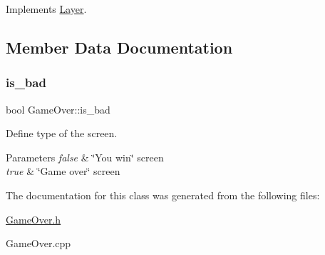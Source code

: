 Implements \hyperlink{class_layer}{Layer}.



\subsection{Member Data Documentation}
\mbox{\label{class_game_over_a4a7103cf4db129cad83b0c001c32d116}} 
\subsubsection{\texorpdfstring{is\+\_\+bad}{is\_bad}}
{\footnotesize\ttfamily bool Game\+Over\+::is\+\_\+bad\hspace{0.3cm}{\ttfamily [private]}}



Define type of the screen. 


\begin{DoxyParams}{Parameters}
{\em false} & \char`\"{}\+You win\char`\"{} screen \\
\hline
{\em true} & \char`\"{}\+Game over\char`\"{} screen \\
\hline
\end{DoxyParams}


The documentation for this class was generated from the following files\+:\begin{DoxyCompactItemize}
\item 
\hyperlink{_game_over_8h}{Game\+Over.\+h}\item 
Game\+Over.\+cpp\end{DoxyCompactItemize}

